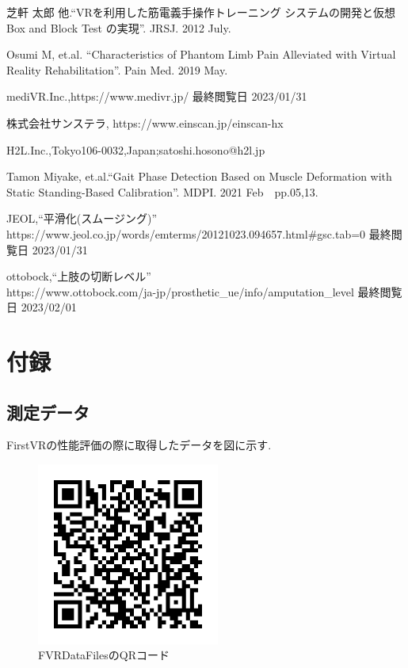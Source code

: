 \documentclass{ltjsreport}
\begin{document}
\begin{thebibliography}{99}

	芝軒 太郎 他.``VRを利用した筋電義手操作トレーニング
	システムの開発と仮想 Box and Block Test の実現''.
	JRSJ. 2012 July.

	Osumi M, et.al.
	``Characteristics of Phantom Limb Pain Alleviated
	with Virtual Reality Rehabilitation''.
	Pain Med. 2019 May.

	mediVR.Inc.,https://www.medivr.jp/
	最終閲覧日 2023/01/31


	株式会社サンステラ, https://www.einscan.jp/einscan-hx
	
	
	
	H2L.Inc.,Tokyo106-0032,Japan;satoshi.hosono@h2l.jp
	


	Tamon Miyake, et.al.``Gait Phase Detection Based on Muscle Deformation
	with Static Standing-Based Calibration''.
	MDPI. 2021 Feb　pp.05,13.


	JEOL,``平滑化(スムージング)''\\
	https://www.jeol.co.jp/words/emterms/20121023.094657.html\#gsc.tab=0
	最終閲覧日 2023/01/31

	ottobock,``上肢の切断レベル''\\
	https://www.ottobock.com/ja-jp/prosthetic\_ue/info/amputation\_level
	最終閲覧日 2023/02/01

\end{thebibliography}

\chapter*{付録}

\appendix
\renewcommand{\thesection}{\Alph{chapter}.\arabic{section}}
\setcounter{chapter}{1}

\section{測定データ}
	FirstVRの性能評価の際に取得したデータを図に示す.
	\begin{figure}[H]
	\centering
	\includegraphics[width = 6cm]{../figs/QRshare.png}
	\caption{FVRDataFilesのQRコード}
	\label{fig:QRcode}
	\end{figure}
	\vspace{-15pt}
	
\end{document}

